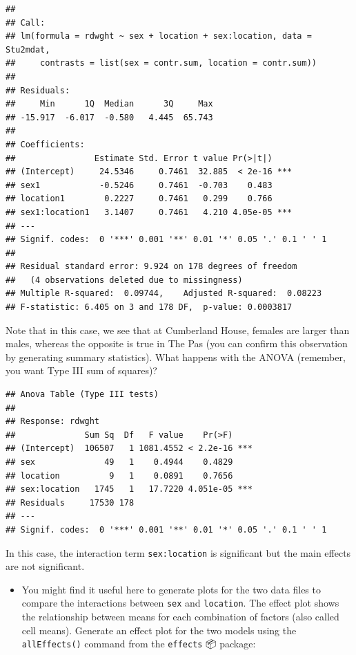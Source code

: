 \documentclass[
  12pt,
]{book}
\providecommand{\tightlist}{%
  \setlength{\itemsep}{0pt}\setlength{\parskip}{0pt}}
\begin{document}
\begin{verbatim}
## 
## Call:
## lm(formula = rdwght ~ sex + location + sex:location, data = Stu2mdat, 
##     contrasts = list(sex = contr.sum, location = contr.sum))
## 
## Residuals:
##     Min      1Q  Median      3Q     Max 
## -15.917  -6.017  -0.580   4.445  65.743 
## 
## Coefficients:
##                Estimate Std. Error t value Pr(>|t|)    
## (Intercept)     24.5346     0.7461  32.885  < 2e-16 ***
## sex1            -0.5246     0.7461  -0.703    0.483    
## location1        0.2227     0.7461   0.299    0.766    
## sex1:location1   3.1407     0.7461   4.210 4.05e-05 ***
## ---
## Signif. codes:  0 '***' 0.001 '**' 0.01 '*' 0.05 '.' 0.1 ' ' 1
## 
## Residual standard error: 9.924 on 178 degrees of freedom
##   (4 observations deleted due to missingness)
## Multiple R-squared:  0.09744,    Adjusted R-squared:  0.08223 
## F-statistic: 6.405 on 3 and 178 DF,  p-value: 0.0003817
\end{verbatim}

Note that in this case, we see that at Cumberland House, females are larger than males, whereas the opposite is true in The Pas (you can confirm this observation by generating summary statistics). What happens with the ANOVA (remember, you want Type III sum of squares)?

\begin{verbatim}
## Anova Table (Type III tests)
## 
## Response: rdwght
##              Sum Sq  Df   F value    Pr(>F)    
## (Intercept)  106507   1 1081.4552 < 2.2e-16 ***
## sex              49   1    0.4944    0.4829    
## location          9   1    0.0891    0.7656    
## sex:location   1745   1   17.7220 4.051e-05 ***
## Residuals     17530 178                        
## ---
## Signif. codes:  0 '***' 0.001 '**' 0.01 '*' 0.05 '.' 0.1 ' ' 1
\end{verbatim}

In this case, the interaction term \texttt{sex:location} is significant but the main effects are not significant.

\begin{itemize}
\tightlist
\item
  You might find it useful here to generate plots for the two data files to compare the interactions between \texttt{sex} and \texttt{location}. The effect plot shows the relationship between means for each combination of factors (also called cell means). Generate an effect plot for the two models using the \texttt{allEffects()} command from the \texttt{effects} 📦 package:
\end{itemize}
\end{document}
